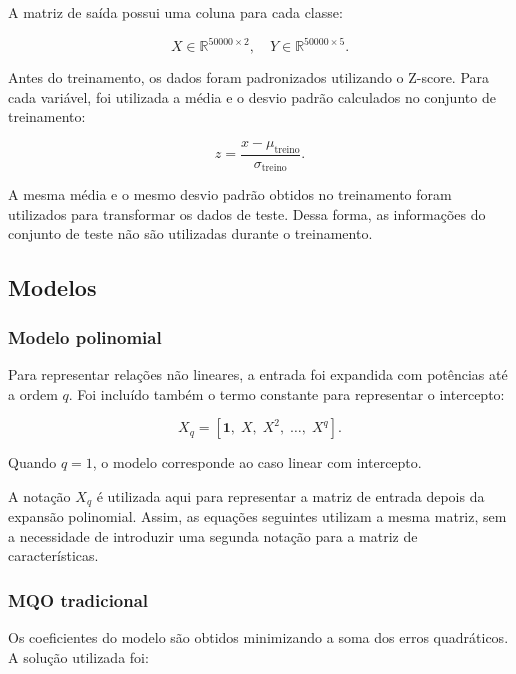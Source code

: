 \documentclass[conference]{IEEEtran}
\begin{document}
A matriz de saída possui uma coluna para cada classe:

\begin{equation}
X \in \mathbb{R}^{50000 \times 2}, \quad
Y \in \mathbb{R}^{50000 \times 5}.
\end{equation}

Antes do treinamento, os dados foram padronizados utilizando o Z-score. Para cada variável, foi utilizada a média e o desvio padrão calculados no conjunto de treinamento:

\begin{equation}
z = \frac{x-\mu_{\text{treino}}}{\sigma_{\text{treino}}}.
\end{equation}

A mesma média e o mesmo desvio padrão obtidos no treinamento foram utilizados para transformar os dados de teste. Dessa forma, as informações do conjunto de teste não são utilizadas durante o treinamento.

\subsection{Modelos}

\subsubsection{Modelo polinomial}

Para representar relações não lineares, a entrada foi expandida com potências até a ordem $q$. Foi incluído também o termo constante para representar o intercepto:

\begin{equation}
X_q = [\mathbf{1},\;X,\;X^2,\;\dots,\;X^q].
\end{equation}

Quando $q=1$, o modelo corresponde ao caso linear com intercepto.

A notação $X_q$ é utilizada aqui para representar a matriz de entrada depois da expansão polinomial. Assim, as equações seguintes utilizam a mesma matriz, sem a necessidade de introduzir uma segunda notação para a matriz de características.

\subsubsection{MQO tradicional}

Os coeficientes do modelo são obtidos minimizando a soma dos erros quadráticos. A solução utilizada foi:
\end{document}
